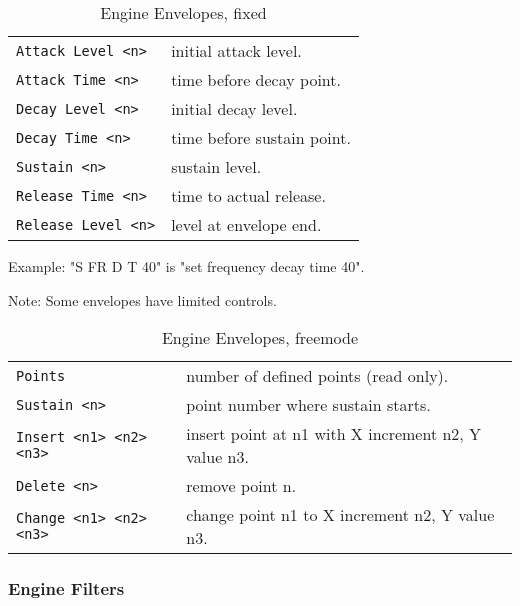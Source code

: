    \begin{table}[H]
      \centering
      \caption{Engine Envelopes, fixed}
      \label{table:yoshimi_engine_envelopes_fixed}
      \begin{tabular}{l l}
\texttt{Attack Level <n>} &
   initial attack level. \\
\texttt{Attack Time <n>} &
   time before decay point. \\
\texttt{Decay Level <n>} &
   initial decay level. \\
\texttt{Decay Time <n>} &
   time before sustain point. \\
\texttt{Sustain <n>} &
   sustain level. \\
\texttt{Release Time <n>} &
   time to actual release. \\
\texttt{Release Level <n>} &
   level at envelope end. \\
      \end{tabular}
   \end{table}

Example: "S FR D T 40" is "set frequency decay time 40".

Note: Some envelopes have limited controls.

   \begin{table}[H]
      \centering
      \caption{Engine Envelopes, freemode}
      \label{table:yoshimi_engine_envelopes_freemode}
      \begin{tabular}{l l}
\texttt{Points} &
   number of defined points (read only). \\
\texttt{Sustain <n>} &
   point number where sustain starts. \\
\texttt{Insert <n1> <n2> <n3>} &
   insert point at n1 with X increment n2, Y value n3. \\
\texttt{Delete <n>} &
   remove point n. \\
\texttt{Change <n1> <n2> <n3>} &
   change point n1 to X increment n2, Y value n3. \\
      \end{tabular}
   \end{table}

\subsubsection{Engine Filters}
\label{subsec:command_line_engine_filters}

